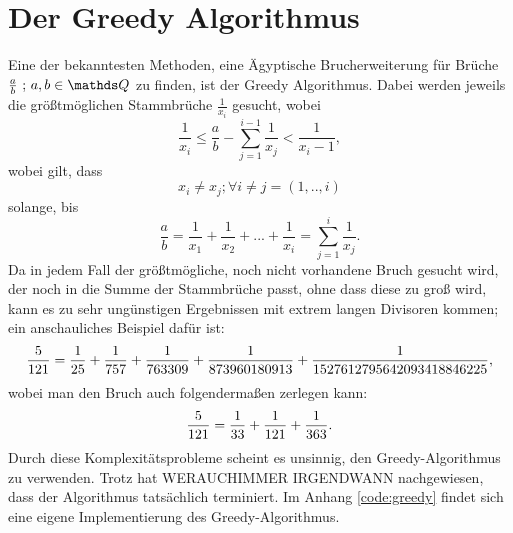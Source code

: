 \section{Der Greedy Algorithmus}
Eine der bekanntesten Methoden, eine Ägyptische  Brucherweiterung
für Brüche $\frac{a}{b} \text{ ; } a, b \in \Q$ zu finden, ist der Greedy Algorithmus. Dabei werden jeweils die größtmöglichen Stammbrüche $\frac{1}{x_i}$ gesucht, wobei
$$\frac{1}{x_i} \leq \frac{a}{b} - \sum_{j=1}^{i-1} \frac{1}{x_j} < \frac{1}{x_{i}-1},$$
wobei gilt, dass
$$x_i \neq x_j; \forall i \neq j = (1,..,i)$$ 
solange, bis
$$\frac{a}{b} = \frac{1}{x_1} + \frac{1}{x_2} + ... + \frac{1}{x_i} = \sum_{j=1}^{i} \frac{1}{x_j}.$$
Da in jedem Fall der größtmögliche, noch nicht vorhandene Bruch gesucht wird, der noch in die Summe der Stammbrüche passt, ohne dass diese zu groß wird, kann es zu sehr ungünstigen Ergebnissen mit extrem langen Divisoren kommen; ein anschauliches Beispiel dafür ist:
$$\frac{5}{121} = \frac{1}{25} + \frac{1}{757} + \frac{1}{763309} + \frac{1}{873960180913} + \frac{1}{1527612795642093418846225},$$
wobei man den Bruch auch folgendermaßen zerlegen kann:
$$\frac{5}{121} = \frac{1}{33} + \frac{1}{121} + \frac{1}{363}.$$
Durch diese Komplexitätsprobleme scheint es unsinnig, den Greedy-Algorithmus zu verwenden. Trotz hat WERAUCHIMMER 
IRGENDWANN  nachgewiesen, dass der Algorithmus tatsächlich terminiert.
Im Anhang \ref{code:greedy} findet sich eine eigene Implementierung des Greedy-Algorithmus.
